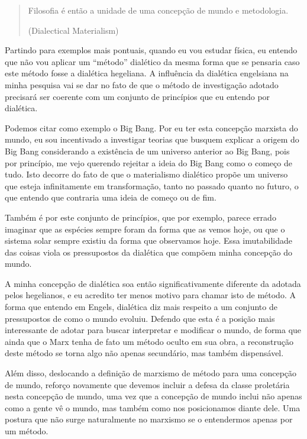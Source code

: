 \begin{quote}
Filosofia é então a unidade de uma concepção de mundo e metodologia.

(Dialectical Materialism)
\end{quote}

Partindo para exemplos mais pontuais, quando eu vou estudar física, eu entendo que não vou aplicar um “método” dialético da mesma forma que se pensaria caso este método fosse a dialética hegeliana. A influência da dialética engelsiana na minha pesquisa vai se dar no fato de que o método de investigação adotado precisará ser coerente com um conjunto de princípios que eu entendo por dialética. 

Podemos citar como exemplo o Big Bang. Por eu ter esta concepção marxista do mundo, eu sou incentivado a investigar teorias que busquem explicar a origem do Big Bang considerando a existência de um universo anterior ao Big Bang, pois por princípio, me vejo querendo rejeitar a ideia do Big Bang como o começo de tudo. Isto decorre do fato de que o materialismo dialético propõe um universo que esteja infinitamente em transformação, tanto no passado quanto no futuro, o que entendo que contraria uma ideia de começo ou de fim.

Também é por este conjunto de princípios, que por exemplo, parece errado imaginar que as espécies sempre foram da forma que as vemos hoje, ou que o sistema solar sempre existiu da forma que observamos hoje. Essa imutabilidade das coisas viola os pressupostos da dialética que compõem minha concepção do mundo.

A minha concepção de dialética soa então significativamente diferente da adotada pelos hegelianos, e eu acredito ter menos motivo para chamar isto de método. A forma que entendo em Engels, dialética diz mais respeito a um conjunto de pressupostos de como o mundo evoluiu. Defendo que esta é a posição mais interessante de adotar para buscar interpretar e modificar o mundo, de forma que ainda que o Marx tenha de fato um método oculto em sua obra, a reconstrução deste método se torna algo não apenas secundário, mas também dispensável.

Além disso, deslocando a definição de marxismo de método para uma concepção de mundo, reforço novamente que devemos incluir a defesa da classe proletária nesta concepção de mundo, uma vez que a concepção de mundo inclui não apenas como a gente vê o mundo, mas também como nos posicionamos diante dele. Uma postura que não surge naturalmente no marxismo se o entendermos apenas por um método.

